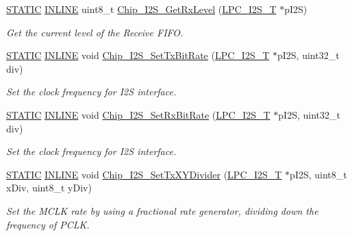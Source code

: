 \begin{DoxyCompactItemize}
\hyperlink{group___l_p_c___types___public___macros_ga10b2d890d871e1489bb02b7e70d9bdfb}{S\+T\+A\+T\+IC} \hyperlink{spifi__18xx__43xx_8h_a2eb6f9e0395b47b8d5e3eeae4fe0c116}{I\+N\+L\+I\+NE} uint8\+\_\+t \hyperlink{group___i2_s__18_x_x__43_x_x_ga5880b341bea64ea33e734af422b43dc3}{Chip\+\_\+\+I2\+S\+\_\+\+Get\+Rx\+Level} (\hyperlink{struct_l_p_c___i2_s___t}{L\+P\+C\+\_\+\+I2\+S\+\_\+T} $\ast$p\+I2S)
\begin{DoxyCompactList}\small\item\em Get the current level of the Receive F\+I\+FO. \end{DoxyCompactList}\item 
\hyperlink{group___l_p_c___types___public___macros_ga10b2d890d871e1489bb02b7e70d9bdfb}{S\+T\+A\+T\+IC} \hyperlink{spifi__18xx__43xx_8h_a2eb6f9e0395b47b8d5e3eeae4fe0c116}{I\+N\+L\+I\+NE} void \hyperlink{group___i2_s__18_x_x__43_x_x_ga4ab6d7b26edf92c1b7bcb7f6f9326888}{Chip\+\_\+\+I2\+S\+\_\+\+Set\+Tx\+Bit\+Rate} (\hyperlink{struct_l_p_c___i2_s___t}{L\+P\+C\+\_\+\+I2\+S\+\_\+T} $\ast$p\+I2S, uint32\+\_\+t div)
\begin{DoxyCompactList}\small\item\em Set the clock frequency for I2S interface. \end{DoxyCompactList}\item 
\hyperlink{group___l_p_c___types___public___macros_ga10b2d890d871e1489bb02b7e70d9bdfb}{S\+T\+A\+T\+IC} \hyperlink{spifi__18xx__43xx_8h_a2eb6f9e0395b47b8d5e3eeae4fe0c116}{I\+N\+L\+I\+NE} void \hyperlink{group___i2_s__18_x_x__43_x_x_gaf18685ebc3f86581fd7075fafe4c72e7}{Chip\+\_\+\+I2\+S\+\_\+\+Set\+Rx\+Bit\+Rate} (\hyperlink{struct_l_p_c___i2_s___t}{L\+P\+C\+\_\+\+I2\+S\+\_\+T} $\ast$p\+I2S, uint32\+\_\+t div)
\begin{DoxyCompactList}\small\item\em Set the clock frequency for I2S interface. \end{DoxyCompactList}\item 
\hyperlink{group___l_p_c___types___public___macros_ga10b2d890d871e1489bb02b7e70d9bdfb}{S\+T\+A\+T\+IC} \hyperlink{spifi__18xx__43xx_8h_a2eb6f9e0395b47b8d5e3eeae4fe0c116}{I\+N\+L\+I\+NE} void \hyperlink{group___i2_s__18_x_x__43_x_x_gaab4e4a66774d56ba378cce2dbc34e9b0}{Chip\+\_\+\+I2\+S\+\_\+\+Set\+Tx\+X\+Y\+Divider} (\hyperlink{struct_l_p_c___i2_s___t}{L\+P\+C\+\_\+\+I2\+S\+\_\+T} $\ast$p\+I2S, uint8\+\_\+t x\+Div, uint8\+\_\+t y\+Div)
\begin{DoxyCompactList}\small\item\em Set the M\+C\+LK rate by using a fractional rate generator, dividing down the frequency of P\+C\+LK. \end{DoxyCompactList}\item 

\end{DoxyCompactItemize}
